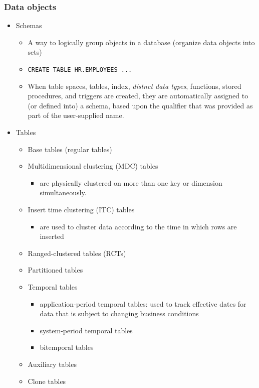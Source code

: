 \documentclass{article}
\begin{document}
\subsubsection{Data objects}
\begin{itemize}
\item Schemas
	\begin{itemize}
	\item A way to logically group objects in a database (organize data objects into sets)
	\item \texttt{CREATE TABLE HR.EMPLOYEES ...}
	\item When table spaces, tables, index, \textit{distnct data types}, functions, stored procedures, and triggers are created, they are
	automatically assigned to (or defined into) a schema, based upon the qualifier that was provided as part of the user-supplied name.
	\end{itemize}
\item Tables
	\begin{itemize}
	\item Base tables (regular tables)
	\item {\color{green} Multidimensional clustering (MDC) tables}
		\begin{itemize}
			\item are physically clustered on more than one key or dimension simultaneously.
		\end{itemize}
	\item {\color{green} Insert time clustering (ITC) tables}
		\begin{itemize}
			\item are used to cluster data according to the time in which rows are inserted
		\end{itemize}
	\item {\color{green} Ranged-clustered tables (RCTs)}
	\item Partitioned tables
	\item Temporal tables
		\begin{itemize}
			\item application-period temporal tables: used to track effective dates for data that is subject to changing business conditions
			\item system-period temporal tables
			\item bitemporal tables
		\end{itemize}
	\item {\color{red} Auxiliary tables}
	\item {\color{red} Clone tables}

\end{itemize}
\end{itemize}
\end{document}
